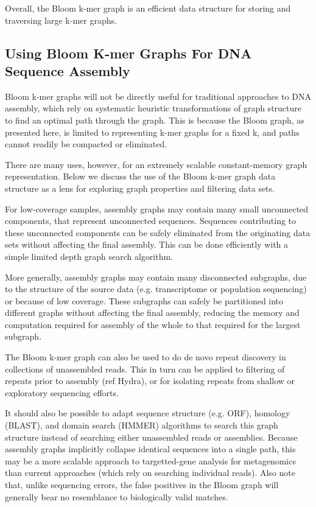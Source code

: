 \documentclass[12pt]{article} \usepackage{simplemargins}
\begin{document}
Overall, the Bloom k-mer graph is an efficient data structure for
storing and traversing large k-mer graphs.

\subsection{Using Bloom K-mer Graphs For DNA Sequence Assembly}
Bloom k-mer graphs will not be directly useful for traditional
approaches to DNA assembly, which rely on systematic heuristic
transformations of graph structure to find an optimal path through the
graph.  This is because the Bloom graph, as presented here, is limited
to representing k-mer graphs for a fixed k, and paths cannot readily
be compacted or eliminated.

There are many uses, however, for an extremely scalable
constant-memory graph representation.  Below we discuss the use of the
Bloom k-mer graph data structure as a lens for exploring graph
properties and filtering data sets.

For low-coverage samples, assembly graphs may contain many small
unconnected components, that represent unconnected sequences.
Sequences contributing to these unconnected components can be safely
eliminated from the originating data sets without affecting the final
assembly.  This can be done efficiently with a simple limited depth
graph search algorithm.

More generally, assembly graphs may contain many disconnected
subgraphs, due to the structure of the source data (e.g. transcriptome
or population sequencing) or because of low coverage.  These subgraphs
can safely be partitioned into different graphs without affecting the
final assembly, reducing the memory and computation required for
assembly of the whole to that required for the largest subgraph.

The Bloom k-mer graph can also be used to do de novo repeat discovery
in collections of unassembled reads.  This in turn can be applied to
filtering of repeats prior to assembly (ref Hydra), or for isolating
repeats from shallow or exploratory sequencing efforts.

It should also be possible to adapt sequence structure (e.g. ORF),
homology (BLAST), and domain search (HMMER) algorithms to search this
graph structure instead of searching either unassembled reads or
assemblies.  Because assembly graphs implicitly collapse identical
sequences into a single path, this may be a more scalable approach to
targetted-gene analysis for metagenomics than current approaches
(which rely on searching individual reads).  Also note that, unlike
sequencing errors, the false positives in the Bloom graph will
generally bear no resemblance to biologically valid matches.
\end{document}
